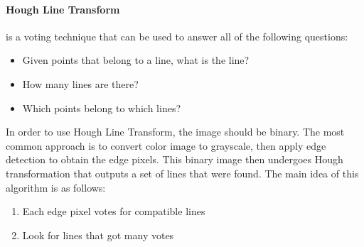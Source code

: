 \paragraph{Hough Line Transform}
is a voting technique that can be used to answer all of the following questions\cite{introduction-to-computer-vision}:
\begin{itemize}
	\item Given points that belong to a line, what is the line?
	\item How many lines are there?
	\item Which points belong to which lines?
\end{itemize}
In order to use Hough Line Transform, the image should be binary. The most common approach is to convert color image to grayscale, then apply edge detection to obtain the edge pixels. This binary image then undergoes Hough transformation that outputs a set of lines that were found. The main idea of this algorithm is as follows:
\begin{enumerate}
	\item Each edge pixel votes for compatible lines
	\item Look for lines that got many votes
\end{enumerate}

